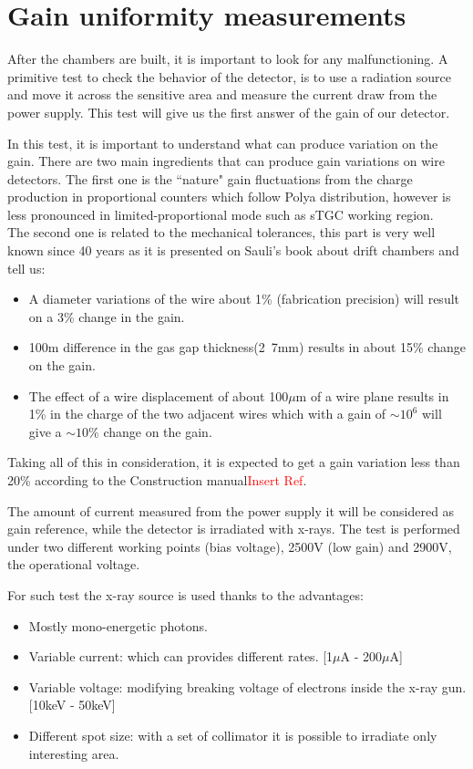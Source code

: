 \section{Gain uniformity measurements}

After the chambers are built, it is important to look for any malfunctioning. A primitive test to check the behavior of
the detector, is to use a radiation source and move it across the sensitive area and measure the current draw from the
power supply. This test will give us the first answer of the gain of our detector.\par
In this test, it is important to understand what can produce variation on the gain. There are two main ingredients that can produce gain variations on wire
detectors. The first one is the ``nature" gain fluctuations from the charge production in proportional counters which
follow Polya distribution, however is less pronounced in limited-proportional mode such as sTGC working region.\\
The second one is related to the mechanical tolerances, this part is very well known since 40 years as it is presented on
Sauli's book \cite{sauli} about drift chambers and tell us:
\begin{itemize}
\item A diameter variations of the wire about 1\% (fabrication precision) will result on a 3\% change in the gain.
\item  \unit{100}{\micro m} difference in the gas gap thickness(\unit{2.7}{mm}) results in about 15\% change on the gain.
\item The effect of a wire displacement of about \unit{100}{$\mu$m}
of a wire plane results in 1\% in the charge of the two adjacent wires which with a gain of $\sim10^6$ will give a
$\sim10\%$ change on the gain.
\end{itemize}
Taking all of this in consideration, it is expected to get a gain variation less than 20\% according to the
Construction manual\textcolor{red}{Insert Ref}.\par

The amount of current measured from the power supply it will be considered as gain reference, while the detector is
irradiated with x-rays. The test is performed under two different working points (bias voltage), 2500V (low gain) and
2900V, the operational voltage.\par

For such test the x-ray source is used thanks to the advantages:\par
\begin{itemize}[noitemsep, topsep=0pt, parsep=0pt, partopsep=2pt]
	\item Mostly mono-energetic photons.
	\item Variable current: which can provides different rates. [\unit{1}{$\mu$A} - \unit{200}{$\mu$A}]
	\item Variable voltage: modifying breaking voltage of electrons inside the x-ray gun. [\unit{10}{keV} - \unit{50}{keV}]
	\item Different spot size: with a set of collimator it is possible to irradiate only interesting area.
\end{itemize}


